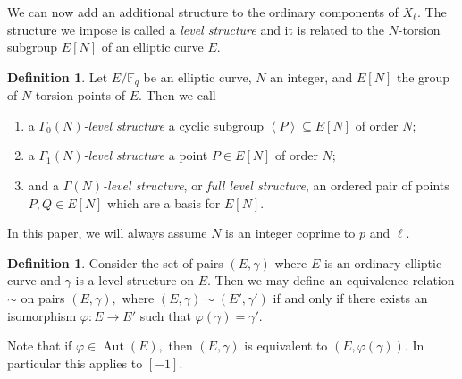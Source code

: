 \documentclass[11pt,a4paper]{amsart}
\theoremstyle{plain}
\theoremstyle{definition}
\newtheorem{defn}[thm]{Definition}
\theoremstyle{remark}
\DeclareMathOperator{\Auto}{Aut}
\begin{document}
We can now add an additional structure to the ordinary components of $X_{\ell}.$ The structure we impose is called a \emph{level structure} and it is related to the $N$-torsion subgroup $E[N]$ of an elliptic curve $E.$
\begin{defn}\label{def:level-structures}
  Let $E/\mathbb{F}_q$ be an elliptic curve, $N$ an integer, and $E[N]$ the group of $N$-torsion points of $E$. Then we call
  \begin{enumerate}
    \item a \emph{$\Gamma_0(N)$-level structure} a cyclic subgroup $\left\langle P \right\rangle \subseteq E[N]$ of order $N$;
    \item a \emph{$\Gamma_1(N)$-level structure} a point $P \in E[N]$ of order $N;$
    \item and a \emph{$\Gamma(N)$-level structure}, or \emph{full level structure}, an ordered pair of points $P, Q \in E[N]$ which are a basis for $E[N].$
  \end{enumerate}
\end{defn}
In this paper, we will always assume $N$ is an integer coprime to $p$ and $\ell.$
\begin{defn}\label{def:vertex-equivalence}
  Consider the set of pairs $(E, \gamma)$ where $E$ is an ordinary elliptic curve and $\gamma$ is a level structure on $E.$ Then we may define an equivalence relation $\sim$ on pairs $(E, \gamma),$  where $(E, \gamma) \sim (E', \gamma')$ if and only if there exists an isomorphism $\varphi: E \to E'$ such that $\varphi(\gamma) = \gamma'.$
\end{defn}
Note that if $\varphi \in \Auto(E),$ then $(E, \gamma)$ is equivalent to $(E, \varphi(\gamma)).$ In particular this applies to $[-1].$
\end{document}
